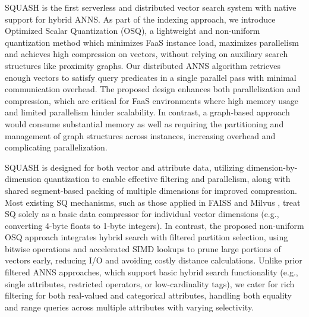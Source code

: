 SQUASH is the first serverless and distributed vector search system with native support for hybrid ANNS. 
As part of the indexing approach, we introduce Optimized Scalar Quantization (OSQ), a lightweight and non-uniform quantization method which minimizes FaaS instance load, maximizes parallelism and achieves high compression on vectors, without relying on auxiliary search structures like proximity graphs. 
Our distributed ANNS algorithm retrieves enough vectors to satisfy query predicates in a single parallel pass with minimal communication overhead.
The proposed design enhances both parallelization and compression, which are critical for FaaS environments where high memory usage and limited parallelism hinder scalability.  
In contrast, a graph-based approach would consume substantial memory as well as requiring the partitioning and management of graph structures across instances, increasing overhead and complicating parallelization.  

SQUASH is designed for both vector and attribute data, utilizing dimension-by-dimension quantization to enable effective filtering and parallelism, along with shared segment-based packing of multiple dimensions for improved compression. 
Most existing SQ mechanisms, such as those applied in FAISS \cite{Johnson2021GPUSearch, douze2024faisslibraryivfsq8} and Milvus \cite{Wang2021Milvus}, treat SQ solely as a basic data compressor for individual vector dimensions (e.g., converting 4-byte floats to 1-byte integers). 
In contrast, the proposed non-uniform OSQ approach integrates hybrid search with filtered partition selection, using bitwise operations and accelerated SIMD lookups to prune large portions of vectors early, reducing I/O and avoiding costly distance calculations. 
Unlike prior filtered ANNS approaches, which support basic hybrid search functionality (e.g., single attributes, restricted operators, or low-cardinality tags), we cater for rich filtering for both real-valued and categorical attributes, handling both equality and range queries across multiple attributes with varying selectivity. 

